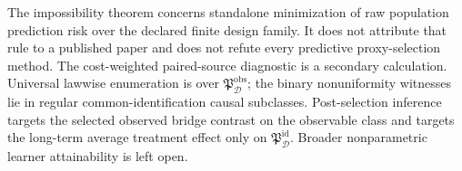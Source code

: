The impossibility theorem concerns standalone minimization of raw population prediction risk over the declared finite design family. It does not attribute that rule to a published paper and does not refute every predictive proxy-selection method. The cost-weighted paired-source diagnostic is a secondary calculation. Universal lawwise enumeration is over \(\mathfrak P_{\mathcal D}^{\mathrm{obs}}\); the binary nonuniformity witnesses lie in regular common-identification causal subclasses. Post-selection inference targets the selected observed bridge contrast on the observable class and targets the long-term average treatment effect only on \(\mathfrak P_{\mathcal D}^{\mathrm{id}}\). Broader nonparametric learner attainability is left open.